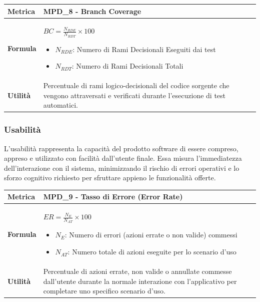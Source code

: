 \documentclass[12pt, a4paper]{article}
\begin{document}
\begin{table}[H]
\centering
\renewcommand{\arraystretch}{1.5}
\begin{tabular}{|l|p{12cm}|}
\hline
\textbf{Metrica} & MPD\_8 - Branch Coverage \\ \hline
\textbf{Formula} & $BC = \frac{N_{RDE}}{N_{RDT}} \times 100$
\begin{itemize}
    \item $N_{RDE}$: Numero di Rami Decisionali Eseguiti dai test
    \item $N_{RDT}$: Numero di Rami Decisionali Totali
\end{itemize} \\ \hline
\textbf{Utilità} & Percentuale di rami logico-decisionali del codice sorgente che vengono attraversati e verificati durante l'esecuzione di test automatici. \\ \hline
\end{tabular}
\end{table}

\subsubsection{Usabilità}
L'usabilità rappresenta la capacità del prodotto software di essere compreso, appreso e utilizzato con facilità dall'utente finale. Essa misura l'immediatezza dell'interazione con il sistema, minimizzando il rischio di errori operativi e lo sforzo cognitivo richiesto per sfruttare appieno le funzionalità offerte.



\begin{table}[H]
\centering
\renewcommand{\arraystretch}{1.5}
\begin{tabular}{|l|p{12cm}|}
\hline
\textbf{Metrica} & MPD\_9 - Tasso di Errore (Error Rate) \\ \hline
\textbf{Formula} & $ER = \frac{N_{E}}{N_{AT}} \times 100$
\begin{itemize}
    \item $N_{E}$: Numero di errori (azioni errate o non valide) commessi
    \item $N_{AT}$: Numero totale di azioni eseguite per lo scenario d'uso
\end{itemize} \\ \hline
\textbf{Utilità} & Percentuale di azioni errate, non valide o annullate commesse dall'utente durante la normale interazione con l'applicativo per completare uno specifico scenario d'uso. \\ \hline
\end{tabular}
\end{table}
\end{document}
